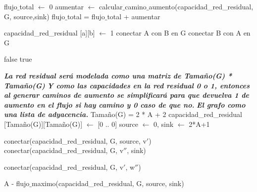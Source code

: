 \begin{algorithmic}
	\State flujo$\_$total $\leftarrow$ 0
	\Repeat 
			\State aumentar $\leftarrow$ calcular$\_$camino$\_$aumento(capacidad_red_residual, G, source,sink)
			\State flujo$\_$total = flujo$\_$total + aumentar
	
\EndFunction
\end{algorithmic}
\hspace{1cm}

\begin{algorithmic}
	\State capacidad_red_residual [a][b] $\leftarrow$ 1
	\State conectar A con B en G
	\State conectar B con A en G
\EndFunction
\end{algorithmic}
\hspace{1cm}


\begin{algorithmic}
			\State \Return false
		\EndIf
	\EndFor	
	\State \Return true
\EndFunction
\end{algorithmic}
\hspace{1cm}

\begin{algorithmic}
	\State \textit{\textbf{La red residual será modelada como una matriz de Tamaño(G) * Tamaño(G)}}
	\State \textit{\textbf{Y como las capacidades en la red residual 0 o 1, entonces al generar caminos de aumento se simplificará para que devuelva 1 de aumento en el flujo si hay camino y 0 caso de que no.}}
	\State \textit{\textbf{El grafo como una lista de adyacencia.}}
	\State Tamaño(G) = 2 * A + 2
	\State capacidad_red_residual [Tamaño(G)][Tamaño(G)] $\leftarrow$ [0 .. 0] 
	\State source $\leftarrow$ 0, sink $\leftarrow$ 2*A+1

		\State conectar(capacidad_red_residual, G, source, v$'$) 
		\State conectar(capacidad_red_residual, G, v$''$, sink) 
	\EndFor

				\State conectar(capacidad_red_residual, G, v$'$, w$''$)
			\EndIf
		\EndFor
	\EndFor
	
	\Return A - flujo$\_$maximo(capacidad_red_residual, G, source, sink)

\EndFunction

\end{algorithmic}


